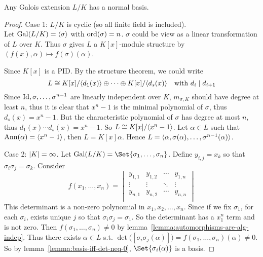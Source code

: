 \begin{theorem}
  Any Galois extension $L/K$ has a normal basis.

  \begin{proof}
    Case 1: $L/K$ is cyclic (so all finite field is included). \\
    Let $\operatorname{Gal}(L/K) = \langle\sigma\rangle$ with $\operatorname{ord}(\sigma) = n$. $\sigma$ could be view as
    a linear transformation of $L$ over $K$. Thus $\sigma$ gives $L$ a
    $K[x]$-module structure by $(f(x), \alpha) \mapsto f(\sigma)(\alpha)$.

    Since $K[x]$ is a PID. By the structure theorem, we could write
    \[ L \cong {K[x]}/{\langle d_1(x)\rangle} \oplus \dots \oplus {K[x]}/{\langle d_s(x)\rangle} \quad
      \text{with } d_i \mid d_{i+1} \]
    Since ${\rm Id}, \sigma, \dots, \sigma^{n-1}$ are linearly independent over $K$,
    $m_{\sigma, K}$ should have degree at least $n$, thus it is clear that $x^n - 1$
    is the minimal polynomial of $\sigma$, thus $d_s(x) = x^n - 1$. But
    the characteristic polynomial of $\sigma$ has degree at most $n$, thus
    $d_1(x) \dotsm d_s(x) = x^n - 1$. So $L \cong K[x] / \langle x^n - 1\rangle$.
    Let $\alpha \in L$ such that $\operatorname{Ann}(\alpha) = \langle x^n - 1\rangle$, then $L = K[x]\alpha$.
    Hence $L = \langle\alpha, \sigma(\alpha), \dots, \sigma^{n-1}(\alpha)\rangle$.

    Case 2: $\lvert K\rvert = \infty$. Let $\Gal(L/K) = \Set{\sigma_1, \dots, \sigma_n}$.
    Define $y_{i, j} = x_k$ so that $\sigma_i \sigma_j = \sigma_{k}$.
    Consider
    \[
      f(x_1, \dots, x_n) = \begin{vmatrix}
        y_{1, 1} & y_{1, 2} & \cdots & y_{1, n} \\
        \vdots & \vdots & \ddots & \vdots \\
        y_{n, 1} & y_{n, 2} & \cdots & y_{n, n} \\
      \end{vmatrix}
    \]
    This determinant is a non-zero polynomial in $x_1, x_2, \dots, x_n$.
    Since if we fix $\sigma_1$, for each $\sigma_i$, exists unique $j$ so that $\sigma_i \sigma_j = \sigma_1$.
    So the determinant has a $x_1^n$ term and is not zero.
    Then $f(\sigma_1, \dots, \sigma_n) \neq 0$ by lemma~\ref{lemma:automorphisms-are-alg-indep}.
    Thus there exists $\alpha \in L$ s.t. $\det\big([\sigma_{i}\sigma_{j}(\alpha)] \big)
    = f(\sigma_1, \dots, \sigma_n)(\alpha) \neq 0$.
    So by lemma~\ref{lemma:basis-iff-det-neq-0}, $\Set{ \sigma_i(\alpha) }$ is a basis.
  \end{proof}
\end{theorem}
